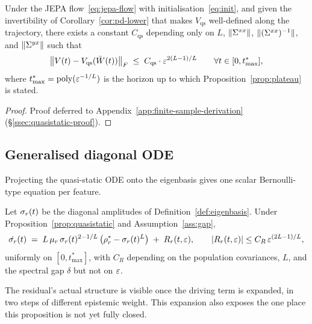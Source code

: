 \begin{proposition}
\label{prop:quasistatic}
Under the JEPA flow~\eqref{eq:jepa-flow} with
initialisation~\eqref{eq:init}, and given the invertibility of
Corollary~\ref{cor:pd-lower} that makes $V_{\mathrm{qs}}$ well-defined along the
trajectory, there exists a constant $C_{\mathrm{qs}}$
depending only on $L$, $\|\Sigma^{xx}\|$, $\|(\Sigma^{xx})^{-1}\|$, and $\|\Sigma^{yx}\|$ such
that
\[
\big\| V(t) - V_{\mathrm{qs}}(\bar{W}(t)) \big\|_F
\;\le\;
C_{\mathrm{qs}} \cdot \varepsilon^{2(L-1)/L}
\qquad
\forall t \in [0, t_{\max}^*],
\]
where $t_{\max}^* = \mathrm{poly}(\varepsilon^{-1/L})$ is the horizon up to
which Proposition~\ref{prop:plateau} is stated.
\end{proposition}

\begin{proof}
Proof deferred to Appendix~\ref{app:finite-sample-derivation}
(\S\ref{ssec:quasistatic-proof}).
\end{proof}

\subsection{Generalised diagonal ODE}
\label{sec:diagonal-ode}

Projecting the quasi-static ODE onto the eigenbasis gives one scalar Bernoulli-type equation per feature.

\begin{proposition}
\label{prop:diagonal-ode}
Let $\sigma_r(t)$ be the diagonal amplitudes of Definition~\ref{def:eigenbasis}.
Under Proposition~\ref{prop:quasistatic} and Assumption~\ref{ass:gap},
\begin{equation}
\label{eq:diagonal-ode}
\dot{\sigma_r}(t)
\;=\;
L\,\mu_r\,\sigma_r(t)^{2-1/L}\,\big(\rho_r^* - \sigma_r(t)^L\big)
\;+\;
R_r(t, \varepsilon),
\qquad
|R_r(t, \varepsilon)| \le C_R\,\varepsilon^{(2L-1)/L},
\end{equation}
uniformly on $[0, t_{\max}^*]$, with $C_R$ depending on the population
covariances, $L$, and the spectral gap $\delta$ but not on $\varepsilon$.
\end{proposition}

The residual's actual structure is visible once the driving term is expanded, in
two steps of different epistemic weight. This expansion also exposes the one place
this proposition is not yet fully closed.

